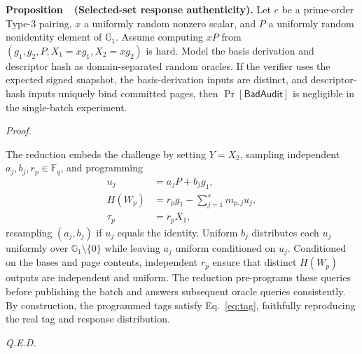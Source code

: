 \documentclass[10pt,journal]{IEEEtran}
\newcounter{proposition}
\newenvironment{proposition}[1]{%
  \refstepcounter{proposition}\par\smallskip\noindent
  \textbf{Proposition~\theproposition\ (#1). }\ignorespaces
}{\par\smallskip}
\newenvironment{claimproof}{\par\noindent\emph{Proof. }\ignorespaces
}{\hfill\textit{Q.E.D.}\par\smallskip}
\begin{document}
\begin{proposition}{Selected-set response authenticity}\label{prop:audit}
Let $e$ be a prime-order Type-3 pairing, $x$ a uniformly random nonzero scalar, and $P$ a uniformly random nonidentity element of $\mathbb G_1$. Assume computing $xP$ from $(g_1,g_2,P,X_1=xg_1,X_2=xg_2)$ is hard. Model the basis derivation and descriptor hash as domain-separated random oracles. If the verifier uses the expected signed snapshot, the basis-derivation inputs are distinct, and descriptor-hash inputs uniquely bind committed pages, then $\Pr[\mathsf{BadAudit}]$ is negligible in the single-batch experiment.
\end{proposition}
\begin{claimproof}
The reduction embeds the challenge by setting $Y=X_2$, sampling independent $a_j,b_j,r_p\in\mathbb F_q$, and programming
\begin{equation}
\begin{aligned}
u_j &= a_jP+b_jg_1,\\
H(W_p)&=r_pg_1-\sum_{j=1}^{s}m_{p,j}u_j,\\
\tau_p&=r_pX_1,
\end{aligned}
\end{equation}
resampling $(a_j,b_j)$ if $u_j$ equals the identity. Uniform $b_j$ distributes each $u_j$ uniformly over $\mathbb G_1\setminus\{0\}$ while leaving $a_j$ uniform conditioned on $u_j$. Conditioned on the bases and page contents, independent $r_p$ ensure that distinct $H(W_p)$ outputs are independent and uniform. The reduction pre-programs these queries before publishing the batch and answers subsequent oracle queries consistently. By construction, the programmed tags satisfy Eq.~\eqref{eq:tag}, faithfully reproducing the real tag and response distribution.


\end{claimproof}
\end{document}
